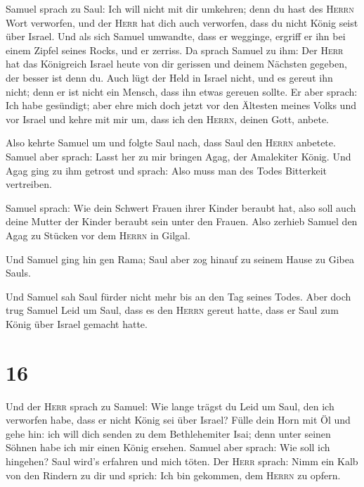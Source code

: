  Samuel sprach zu Saul: Ich will nicht mit dir umkehren;
denn du hast des \textsc{Herrn} Wort verworfen, und der \textsc{Herr}
hat dich auch verworfen, dass du nicht König seist über Israel.
 Und als sich Samuel umwandte, dass er wegginge, ergriff
er ihn bei einem Zipfel seines Rocks, und er zerriss.  Da
sprach Samuel zu ihm: Der \textsc{Herr} hat das Königreich Israel heute
von dir gerissen und deinem Nächsten gegeben, der besser ist denn du.
 Auch lügt der Held in Israel nicht, und es gereut ihn
nicht; denn er ist nicht ein Mensch, dass ihn etwas gereuen sollte.
 Er aber sprach: Ich habe gesündigt; aber ehre mich doch
jetzt vor den Ältesten meines Volks und vor Israel und kehre mit mir um,
dass ich den \textsc{Herrn}, deinen Gott, anbete.

 Also kehrte Samuel um und folgte Saul nach, dass Saul
den \textsc{Herrn} anbetete.  Samuel aber sprach: Lasst
her zu mir bringen Agag, der Amalekiter König. Und Agag ging zu ihm
getrost und sprach: Also muss man des Todes Bitterkeit vertreiben.

 Samuel sprach: Wie dein Schwert Frauen ihrer Kinder
beraubt hat, also soll auch deine Mutter der Kinder beraubt sein unter
den Frauen. Also zerhieb Samuel den Agag zu Stücken vor dem
\textsc{Herrn} in Gilgal.

 Und Samuel ging hin gen Rama; Saul aber zog hinauf zu
seinem Hause zu Gibea Sauls.

 Und Samuel sah Saul fürder nicht mehr bis an den Tag
seines Todes. Aber doch trug Samuel Leid um Saul, dass es den
\textsc{Herrn} gereut hatte, dass er Saul zum König über Israel gemacht
hatte.

\hypertarget{section-15}{%
\section{16}\label{section-15}}

 Und der \textsc{Herr} sprach zu Samuel: Wie lange trägst
du Leid um Saul, den ich verworfen habe, dass er nicht König sei über
Israel? Fülle dein Horn mit Öl und gehe hin: ich will dich senden zu dem
Bethlehemiter Isai; denn unter seinen Söhnen habe ich mir einen König
ersehen.  Samuel aber sprach: Wie soll ich hingehen? Saul
wird's erfahren und mich töten. Der \textsc{Herr} sprach: Nimm ein Kalb
von den Rindern zu dir und sprich: Ich bin gekommen, dem \textsc{Herrn}
zu opfern.

